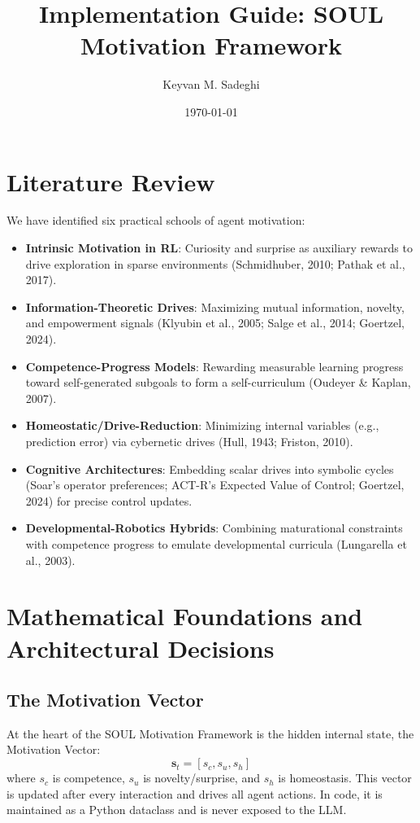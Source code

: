 \documentclass[11pt]{article}
\title{Implementation Guide: SOUL Motivation Framework}
\author{Keyvan M. Sadeghi}
\date{\today}
\begin{document}
\maketitle

\section{Literature Review}

We have identified six practical schools of agent motivation:

\begin{itemize}
  \item \textbf{Intrinsic Motivation in RL}: Curiosity and surprise as auxiliary rewards to drive exploration in sparse environments (Schmidhuber, 2010; Pathak et al., 2017).
  \item \textbf{Information-Theoretic Drives}: Maximizing mutual information, novelty, and empowerment signals (Klyubin et al., 2005; Salge et al., 2014; Goertzel, 2024).
  \item \textbf{Competence-Progress Models}: Rewarding measurable learning progress toward self-generated subgoals to form a self-curriculum (Oudeyer \& Kaplan, 2007).
  \item \textbf{Homeostatic/Drive-Reduction}: Minimizing internal variables (e.g., prediction error) via cybernetic drives (Hull, 1943; Friston, 2010).
  \item \textbf{Cognitive Architectures}: Embedding scalar drives into symbolic cycles (Soar's operator preferences; ACT-R's Expected Value of Control; Goertzel, 2024) for precise control updates.
  \item \textbf{Developmental-Robotics Hybrids}: Combining maturational constraints with competence progress to emulate developmental curricula (Lungarella et al., 2003).
\end{itemize}

\section{Mathematical Foundations and Architectural Decisions}

\subsection{The Motivation Vector}
At the heart of the SOUL Motivation Framework is the hidden internal state, the Motivation Vector:
\[
  \mathbf{s}_t = [s_c, s_u, s_h]
\]
where $s_c$ is competence, $s_u$ is novelty/surprise, and $s_h$ is homeostasis. This vector is updated after every interaction and drives all agent actions. In code, it is maintained as a Python dataclass and is never exposed to the LLM.
\end{document}
